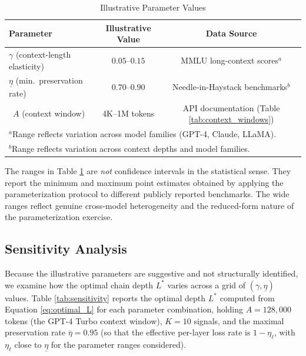 \begin{table}[htbp]
\centering
\caption{Illustrative Parameter Values}
\label{tab:calibrated_params}
\begin{tabular}{lcc}
\toprule
Parameter & Illustrative Value & Data Source \\
\midrule
$\gamma$ (context-length elasticity) & $0.05$--$0.15$ & MMLU long-context scores$^a$ \\
$\underline{\eta}$ (min.~preservation rate) & $0.70$--$0.90$ & Needle-in-Haystack benchmarks$^b$ \\\
$A$ (context window) & 4K--1M tokens & API documentation (Table \ref{tab:context_windows}) \\
\bottomrule
\multicolumn{3}{l}{\footnotesize{$^a$Range reflects variation across model families (GPT-4, Claude, LLaMA).}} \\
\multicolumn{3}{l}{\footnotesize{$^b$Range reflects variation across context depths and model families.}} \\
\end{tabular}
\end{table}

The ranges in Table \ref{tab:calibrated_params} are \emph{not} confidence intervals in the statistical sense. They report the minimum and maximum point estimates obtained by applying the parameterization protocol to different publicly reported benchmarks. The wide ranges reflect genuine cross-model heterogeneity and the reduced-form nature of the parameterization exercise.

\subsection{Sensitivity Analysis}
\label{subsec:sensitivity}

Because the illustrative parameters are suggestive and not structurally identified, we examine how the optimal chain depth $L^*$ varies across a grid of $(\gamma, \underline{\eta})$ values. Table \ref{tab:sensitivity} reports the optimal depth $L^*$ computed from Equation \ref{eq:optimal_L} for each parameter combination, holding $A = 128{,}000$ tokens (the GPT-4 Turbo context window), $K = 10$ signals, and the maximal preservation rate $\bar{\eta} = 0.95$ (so that the effective per-layer loss rate is $1 - \eta_\ell$, with $\eta_\ell$ close to $\underline{\eta}$ for the parameter ranges considered).

